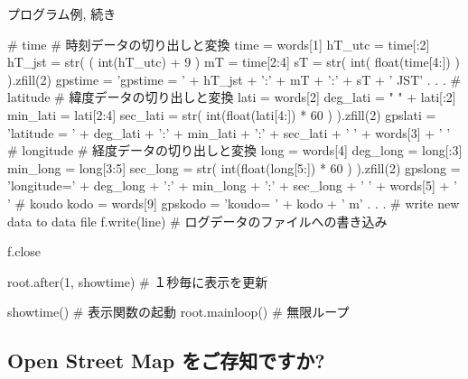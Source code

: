 \documentclass[mingoth,a4paper]{jsarticle}
\begin{document}
\begin{enumerate}
\clearpage
プログラム例, 続き
\begin{commandline}
	# time # 時刻データの切り出しと変換
	time = words[1] 
	hT_utc = time[:2] 
	hT_jst = str( ( int(hT_utc) + 9 ) %
	mT = time[2:4] 
	sT = str( int( float(time[4:]) ) ).zfill(2) 
	gpstime = 'gpstime  = ' + hT_jst + ':' + mT + ':' + sT + ' JST' 
	. 
	. 
	. 
	# latitude # 緯度データの切り出しと変換
	lati = words[2] 
	deg_lati = " " + lati[:2] 
	min_lati = lati[2:4] 
	sec_lati = str( int(float(lati[4:]) * 60 ) ).zfill(2) 
	gpslati = 'latitude = ' + deg_lati + ':' + min_lati + ':' + sec_lati + ' ' + words[3] + '  ' 
	# longitude # 経度データの切り出しと変換
	long = words[4] 
	deg_long = long[:3] 
	min_long = long[3:5] 
	sec_long = str( int(float(long[5:]) * 60 ) ).zfill(2) 
	gpslong  = 'longitude=' + deg_long + ':' + min_long + ':' + sec_long + ' ' + words[5] + '  ' 
	# koudo 
	kodo = words[9] 
	gpskodo  = 'koudo= ' + kodo + ' m' 
	. 
	. 
	. 
	# write new data to data file 
	f.write(line) 		# ログデータのファイルへの書き込み

	f.close 

	root.after(1, showtime) # １秒毎に表示を更新

showtime() # 表示関数の起動
root.mainloop() # 無限ループ
\end{commandline}
\end{enumerate}

\clearpage
{}

\subsection{Open Street Map をご存知ですか?}
\end{document}
